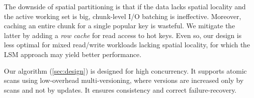 The downside of spatial partitioning is that if the data lacks spatial locality and the active working set is big, 
chunk-level I/O batching is ineffective. Moreover, 
caching an entire chunk for a single popular key is wasteful. 
We mitigate the latter by adding a \emph{row cache} for read access to hot keys. Even so, 
our design is less optimal for mixed read/write workloads lacking spatial locality, for which the LSM approach may yield better performance.  


Our algorithm (\cref{sec:design}) is designed for high concurrency. 
It supports atomic scans using low-overhead multi-versioning, where versions are increased only by scans and not by updates. 
It ensures consistency and correct failure-recovery. 

